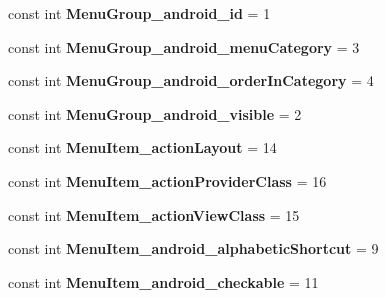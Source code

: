 \begin{DoxyCompactItemize}
const int {\bfseries Menu\+Group\+\_\+android\+\_\+id} = 1
\item 
\mbox{\label{class_pinned_app_1_1_droid_1_1_resource_1_1_styleable_a627522f0ceebde401462705516b13013}} 
const int {\bfseries Menu\+Group\+\_\+android\+\_\+menu\+Category} = 3
\item 
\mbox{\label{class_pinned_app_1_1_droid_1_1_resource_1_1_styleable_a82458492e5fde56c454eb39f13ca7dd4}} 
const int {\bfseries Menu\+Group\+\_\+android\+\_\+order\+In\+Category} = 4
\item 
\mbox{\label{class_pinned_app_1_1_droid_1_1_resource_1_1_styleable_a8780794cab8c66f0b0eb264eae07ea60}} 
const int {\bfseries Menu\+Group\+\_\+android\+\_\+visible} = 2
\item 
\mbox{\label{class_pinned_app_1_1_droid_1_1_resource_1_1_styleable_a82f9b012b3f2e9d815eb0075a5b13c36}} 
const int {\bfseries Menu\+Item\+\_\+action\+Layout} = 14
\item 
\mbox{\label{class_pinned_app_1_1_droid_1_1_resource_1_1_styleable_ab5b730be0a15e642274e746621bae602}} 
const int {\bfseries Menu\+Item\+\_\+action\+Provider\+Class} = 16
\item 
\mbox{\label{class_pinned_app_1_1_droid_1_1_resource_1_1_styleable_a84b4e616e54a6535afe5125c68b07897}} 
const int {\bfseries Menu\+Item\+\_\+action\+View\+Class} = 15
\item 
\mbox{\label{class_pinned_app_1_1_droid_1_1_resource_1_1_styleable_abf094ddb52b7c479e7fb6bb14727f683}} 
const int {\bfseries Menu\+Item\+\_\+android\+\_\+alphabetic\+Shortcut} = 9
\item 
\mbox{\label{class_pinned_app_1_1_droid_1_1_resource_1_1_styleable_af5095418580e3f8de4aaf21c4d3e1a7e}} 
const int {\bfseries Menu\+Item\+\_\+android\+\_\+checkable} = 11

\end{DoxyCompactItemize}
